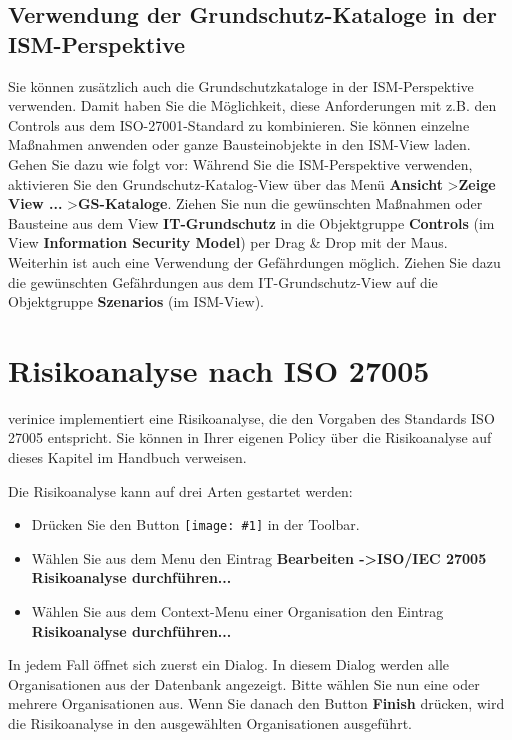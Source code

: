 \documentclass[a4paper,10pt]{book}
\newcommand{\icon}[1]{\texttt{[image: \#1]}}
\begin{document}
\subsection[Verwendung der Grundschutz-Kataloge \\ in der ISM-Perspektive]{Verwendung der Grundschutz-Kataloge in der ISM-Perspektive}
Sie können zusätzlich auch die Grundschutzkataloge in der ISM-Perspektive verwenden. Damit haben Sie die Möglichkeit, diese Anforderungen mit z.B.
den Controls aus dem ISO-27001-Standard zu kombinieren. Sie können einzelne Maßnahmen anwenden oder ganze Bausteinobjekte in den ISM-View laden.
\newline\\
Gehen Sie dazu wie folgt vor: Während Sie die ISM-Perspektive verwenden, aktivieren Sie den Grundschutz-Katalog-View über
das Menü \textbf{Ansicht} \textgreater \textbf{Zeige View ...} \textgreater \textbf{GS-Kataloge}. Ziehen Sie nun die gewünschten Maßnahmen oder Bausteine aus dem View
\textbf{IT-Grundschutz} in die Objektgruppe \textbf{Controls} (im View \textbf{Information Security Model}) per Drag \& Drop mit der Maus.
\newline\\
Weiterhin ist auch eine Verwendung der Gefährdungen möglich. Ziehen Sie dazu die gewünschten Gefährdungen aus dem
IT-Grundschutz-View auf die Objektgruppe \textbf{Szenarios} (im ISM-View).

\section{Risikoanalyse nach ISO 27005}
\label{sec:Risk Assessment ISO 27005}
verinice implementiert eine Risikoanalyse, die den Vorgaben des Standards ISO 27005 entspricht. Sie können in Ihrer eigenen Policy über die Risikoanalyse auf dieses Kapitel im Handbuch verweisen.


Die Risikoanalyse kann auf drei Arten gestartet werden:
\begin{itemize}
 \item Drücken Sie den Button \icon{Icon/16-paper-calculate-percent.png} in der Toolbar.
 \item Wählen Sie aus dem Menu den Eintrag \textbf {Bearbeiten -\textgreater ISO/IEC 27005 Risikoanalyse durchführen...}
 \item Wählen Sie aus dem Context-Menu einer Organisation den Eintrag \textbf {Risikoanalyse durchführen...}
\end{itemize}

In jedem Fall öffnet sich zuerst ein Dialog. In diesem Dialog werden alle Organisationen aus der Datenbank angezeigt. Bitte wählen Sie nun eine oder mehrere Organisationen aus.
Wenn Sie danach den Button \textbf {Finish} drücken, wird die Risikoanalyse in den ausgewählten Organisationen ausgeführt.
\end{document}
